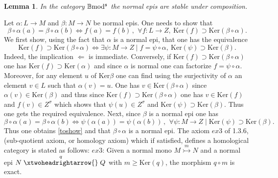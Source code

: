 \documentclass[12pt]{article}
\newtheorem{lem}[thm]{Lemma}
\def\B{{\mathbb B}}
\def\qqq{\,,\,~\forall}
\def\ker{{\mbox{Ker}}}
\def\b2{{\rm \B mod^{\mathfrak s}}}
\begin{document}
 \begin{lem}\label{stablenormepis} In the category $\b2$ the normal epis are stable under composition.	
\end{lem}
\proof Let  $\alpha:L\to M$ and $\beta:M\to N$ be normal epis. One needs to show that 
\begin{equation}\label{toshow}
\beta\circ \alpha(a)=\beta\circ \alpha(b)\iff f(a)=f(b)\qqq f:L\to Z,\ \ker(f)\supset \ker(\beta\circ\alpha).	
\end{equation}
We first show, using the fact that $\alpha$ is a normal epi, that one has the equivalence $$\ker(f)\supset \ker(\beta\circ\alpha)\iff \exists \psi:M\to Z\mid f=\psi\circ\alpha, \ \ker(\psi)\supset \ker(\beta).$$
Indeed, the implication $\Leftarrow$ is immediate. Conversely, if $\ker(f)\supset \ker(\beta\circ\alpha)$
one has $\ker(f)\supset \ker(\alpha)$ and since $\alpha$ is normal one can factorize $f=\psi\circ\alpha$. Moreover, for any element $u$ of $\ker\beta$ one can find using the surjectivity of $\alpha$ an element $v\in L$ such that $\alpha(v)=u$. One has $v\in \ker(\beta\circ\alpha)$ since $\alpha(v)\in \ker(\beta)$ and thus since $\ker(f)\supset \ker(\beta\circ\alpha)$ one has $v\in \ker(f)$ and $f(v)\in Z^\sigma$ which shows that $\psi(u)\in Z^\sigma$ and $\ker(\psi)\supset \ker(\beta)$. Thus one gets the required equivalence. Next, since $\beta$ is a normal epi one has 
$$
\beta\circ \alpha(a)=\beta\circ \alpha(b)\iff \psi(\alpha(a))=\psi(\alpha(b))\qqq\psi:M\to Z\mid \ker(\psi)\supset \ker(\beta).
$$
 Thus one obtains \eqref{toshow} and that $\beta\circ \alpha$ is a normal epi. \endproof 
  The axiom $ex3$ of  \cite{gra1} 1.3.6, (sub-quotient axiom, or homology axiom) which if satisfied, defines a  homological category is stated as follows:\newline
  $ex3$: Given a normal mono $M\stackrel{m}{\rightarrowtail} N$ and a normal epi $N\stackrel{q}{\xtwoheadrightarrow{}} Q$ with $m\geq \ker(q)$,  the morphism $q\circ m$ is exact.\vspace{.05in}
  
\end{document}
